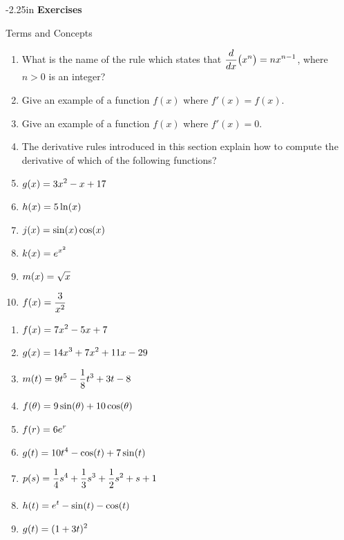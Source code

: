 \begin{adjustwidth*}{}{-2.25in}
\textbf{{\large Exercises}}
\setlength{\columnsep}{25pt}
\begin{multicols*}{2}
\noindent Terms and Concepts \small
\begin{enumerate}[1)]
\item What is the name of the rule which states that $\displaystyle \frac{d}{dx}\big(x^n\big) = nx^{n-1}$, where $n>0$ is an integer?
\item Give an example of a function $f(x)$ where $f'(x) = f(x)$.
\item Give an example of a function $f(x)$ where $f'(x) = 0$.
\item The derivative rules introduced in this section explain how to compute the derivative of which of the following functions?

\setlength{\columnsep}{15pt}
\bmtwo
\ba
\item $\displaystyle g(x) = 3x^2-x+17$ 
\item $\displaystyle h(x) = 5\ln(x)$ 
\item $\displaystyle j(x) = \sin(x) \cos(x)$ 
\item $\displaystyle k(x) = e^{x^2}$
\item $\displaystyle m(x) = \sqrt{x}$
\item $\displaystyle f(x) = \frac{3}{x^2}$ 
\ea
\emtwo
\setlength{\columnsep}{25pt}
\end{enumerate} 

 \small


\begin{enumerate}[1),resume]
\item $\displaystyle f(x) = 7x^2-5x+7$
\item $\displaystyle g(x) = 14x^3+7x^2+11x-29$
\item $\displaystyle m(t) = 9t^5-\frac{1}{8}t^3+3t-8$
\item $\displaystyle f(\theta) = 9\sin(\theta) + 10\cos(\theta)$
\item $\displaystyle f(r) = 6e^r$
\item $\displaystyle g(t) = 10t^4-\cos(t) +7\sin(t)$
\item $\displaystyle p(s) = \frac{1}{4}s^4+\frac{1}{3}s^3+\frac{1}{2}s^2+s+1$
\item $\displaystyle h(t) = e^t - \sin(t) - \cos(t)$
\item $\displaystyle g(t) = (1+3t)^2$
\end{enumerate}



\end{multicols*}
\end{adjustwidth*}
